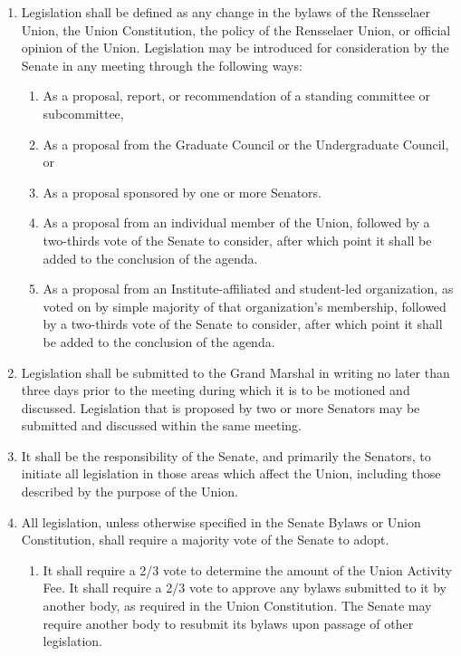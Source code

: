 \documentclass{uniondoc}
\begin{document}
\begin{enumerate}
	\item Legislation shall be defined as any change in the bylaws of the Rensselaer Union, the Union Constitution, the policy of the Rensselaer Union, or official opinion of the Union.
	      Legislation may be introduced for consideration by the Senate in any meeting through the following ways:
	      \begin{enumerate}
		      \item As a proposal, report, or recommendation of a standing committee or subcommittee,
		      \item As a proposal from the Graduate Council or the Undergraduate Council, or
		      \item As a proposal sponsored by one or more Senators.
		      \item As a proposal from an individual member of the Union, followed by a two-thirds vote of the Senate to consider, after which point it shall be added to the conclusion of the agenda.
		      \item As a proposal from an Institute-affiliated and student-led organization, as voted on by simple majority of that organization’s membership, followed by a two-thirds vote of the Senate to consider, after which point it shall be added to the conclusion of the agenda.
	      \end{enumerate}
	\item Legislation shall be submitted to the Grand Marshal in writing no later than three days prior to the meeting during which it is to be motioned and discussed.
	      Legislation that is proposed by two or more Senators may be submitted and discussed within the same meeting.
	\item It shall be the responsibility of the Senate, and primarily the Senators, to initiate all legislation in those areas which affect the Union, including those described by the purpose of the Union.
	\item All legislation, unless otherwise specified in the Senate Bylaws or Union Constitution, shall require a majority vote of the Senate to adopt.
	      \begin{enumerate}
		      \item It shall require a 2/3 vote to determine the amount of the Union Activity Fee.
		            It shall require a 2/3 vote to approve any bylaws submitted to it by another body, as required in the Union Constitution.
		            The Senate may require another body to resubmit its bylaws upon passage of other legislation.

\end{enumerate}
\end{enumerate}
\end{document}
